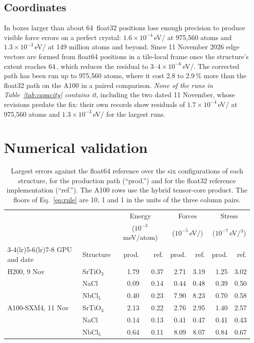 \documentclass[11pt]{article}
\newcommand{\angstrom}{\text{\AA}}
\begin{document}
\subsection{Coordinates}
\label{sec:coords}

In boxes larger than about 64\,\angstrom{} float32 positions lose enough precision to produce visible force
errors on a perfect crystal: $1.6\times10^{-4}$\,eV/\angstrom{} at 975{,}560 atoms and
$1.3\times10^{-3}$\,eV/\angstrom{} at 149 million atoms and beyond. Since 11 November 2026 edge vectors are
formed from float64 positions in a tile-local frame once the structure's extent reaches 64\,\angstrom{}, which
reduces the residual to $3$--$4\times10^{-6}$\,eV/\angstrom{}. The corrected path has been run up to 975{,}560
atoms, where it cost 2.8 to 2.9\,\% more than the float32 path on the A100 in a paired comparison. \emph{None of
the runs in Table~\ref{tab:capacity} contains it}, including the two dated 11 November, whose revisions predate
the fix: their own records show residuals of $1.7\times10^{-4}$\,eV/\angstrom{} at 975{,}560 atoms and
$1.3\times10^{-3}$\,eV/\angstrom{} for the largest runs.

\section{Numerical validation}
\label{sec:validation}

\begin{table}[t]
\centering
\small
\setlength{\tabcolsep}{5pt}
\begin{tabular}{llrrrrrr}
\toprule
 & & \multicolumn{2}{c}{Energy} & \multicolumn{2}{c}{Forces} & \multicolumn{2}{c}{Stress} \\
 & & \multicolumn{2}{c}{($10^{-3}$\,meV/atom)} & \multicolumn{2}{c}{($10^{-5}$\,eV/\angstrom)} &
     \multicolumn{2}{c}{($10^{-7}$\,eV/\angstrom$^3$)} \\
\cmidrule(lr){3-4}\cmidrule(lr){5-6}\cmidrule(lr){7-8}
GPU and date & Structure & prod. & ref. & prod. & ref. & prod. & ref. \\
\midrule
H200, 9 Nov        & SrTiO$_3$ & 1.79 & 0.37 & 2.71 & 3.19 & 1.25 & 3.02 \\
                   & NaCl      & 0.09 & 0.14 & 0.44 & 0.48 & 0.39 & 0.50 \\
                   & NbCl$_5$  & 0.40 & 0.23 & 7.90 & 8.23 & 0.70 & 0.58 \\
\addlinespace[2pt]
A100-SXM4, 11 Nov  & SrTiO$_3$ & 2.13 & 0.22 & 2.76 & 2.95 & 1.40 & 2.57 \\
                   & NaCl      & 0.14 & 0.13 & 0.41 & 0.47 & 0.41 & 0.43 \\
                   & NbCl$_5$  & 0.64 & 0.11 & 8.09 & 8.07 & 0.84 & 0.67 \\
\bottomrule
\end{tabular}
\caption{Largest errors against the float64 reference over the six configurations of each structure, for the
production path (``prod.'') and for the float32 reference implementation (``ref.''). The A100 rows use the
hybrid tensor-core product. The floors of Eq.~\eqref{eq:rule} are 10, 1 and 1 in the units of the three column
pairs.}
\label{tab:gate}
\end{table}
\end{document}

